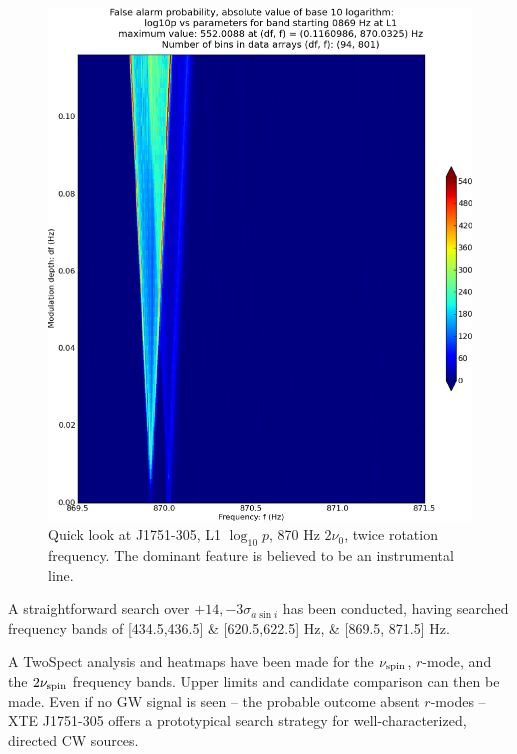 \begin{figure}
\begin{center}
\includegraphics[width=0.68\paperwidth,height=0.48\paperheight]{plots/DFvsFresultsProb-L1_pulsar-0869.eps}
\caption{
Quick look at J1751-305, L1 $\log_{10}p$, 870 Hz $2\nu_0$, twice rotation frequency. The dominant feature is believed to be an instrumental line.}
\end{center}
\end{figure}

A straightforward search over $+14, -3 \sigma_{a \sin i}$ has been conducted, having
searched frequency bands of [434.5,436.5] \& [620.5,622.5] Hz, \& [869.5, 871.5] Hz.


A TwoSpect analysis and heatmaps have been made for the $\nu_\textup{spin}$, $r$-mode, and the $2\nu_\textup{spin}$ frequency bands.
Upper limits and candidate comparison can then be made.
Even if no GW signal is seen -- the probable outcome absent $r$-modes -- XTE J1751-305 offers a prototypical search strategy for well-characterized, directed CW sources.


